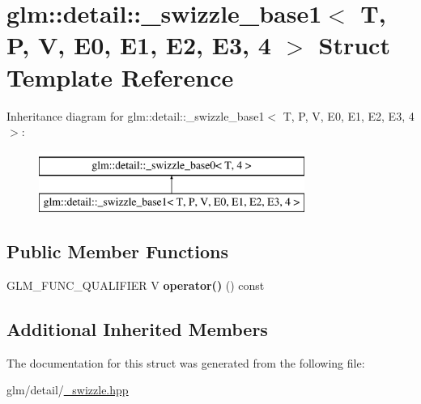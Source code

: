 \hypertarget{structglm_1_1detail_1_1__swizzle__base1_3_01T_00_01P_00_01V_00_01E0_00_01E1_00_01E2_00_01E3_00_014_01_4}{\section{glm\-:\-:detail\-:\-:\-\_\-swizzle\-\_\-base1$<$ T, P, V, E0, E1, E2, E3, 4 $>$ Struct Template Reference}
\label{structglm_1_1detail_1_1__swizzle__base1_3_01T_00_01P_00_01V_00_01E0_00_01E1_00_01E2_00_01E3_00_014_01_4}
}
Inheritance diagram for glm\-:\-:detail\-:\-:\-\_\-swizzle\-\_\-base1$<$ T, P, V, E0, E1, E2, E3, 4 $>$\-:\begin{figure}[H]
\begin{center}
\leavevmode
\includegraphics[height=2.000000cm]{structglm_1_1detail_1_1__swizzle__base1_3_01T_00_01P_00_01V_00_01E0_00_01E1_00_01E2_00_01E3_00_014_01_4}
\end{center}
\end{figure}
\subsection*{Public Member Functions}
\begin{DoxyCompactItemize}
\item 
\hypertarget{structglm_1_1detail_1_1__swizzle__base1_3_01T_00_01P_00_01V_00_01E0_00_01E1_00_01E2_00_01E3_00_014_01_4_a901f3af50b0eb022c3246b5de5027245}{G\-L\-M\-\_\-\-F\-U\-N\-C\-\_\-\-Q\-U\-A\-L\-I\-F\-I\-E\-R V {\bfseries operator()} () const }\label{structglm_1_1detail_1_1__swizzle__base1_3_01T_00_01P_00_01V_00_01E0_00_01E1_00_01E2_00_01E3_00_014_01_4_a901f3af50b0eb022c3246b5de5027245}

\end{DoxyCompactItemize}
\subsection*{Additional Inherited Members}


The documentation for this struct was generated from the following file\-:\begin{DoxyCompactItemize}
\item 
glm/detail/\hyperlink{__swizzle_8hpp}{\-\_\-swizzle.\-hpp}\end{DoxyCompactItemize}
